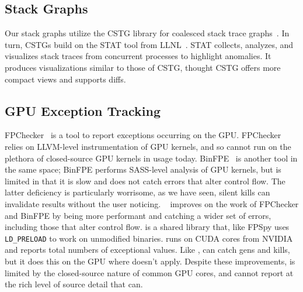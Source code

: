 \documentclass{juliacon}
\begin{document}
\subsection{Stack Graphs}

Our stack graphs utilize the CSTG library for coalesced stack trace graphs~\cite{humphreySystematicDebuggingMethods2014}.
In turn, CSTGs build on the STAT tool from LLNL~\cite{arnoldStackTraceAnalysis2007}.
STAT collects, analyzes, and visualizes stack traces from concurrent processes
to highlight anomalies.
It produces visualizations similar to those of CSTG, thought CSTG offers more compact views and supports diffs.

\subsection{GPU Exception Tracking}

FPChecker~\cite{l-ase-2019} is a tool to report \fp{} exceptions occurring on the GPU.
FPChecker relies on LLVM-level instrumentation of GPU kernels, and so cannot run on the plethora of closed-source GPU kernels in usage today.
BinFPE~\cite{llg-soap-2022} is another tool in the same space;
BinFPE performs SASS-level analysis of GPU kernels, but is limited in that it is slow and does not catch errors that alter control flow.
The latter deficiency is particularly worrisome, as we have seen, silent \NaN{} kills can invalidate results without the user noticing.
\GPUFPX{}~\cite{llsflg-hpdc-2023} improves on the work of FPChecker and BinFPE by being more performant and catching a wider set of errors, including those that alter control flow.
\GPUFPX{} is a shared library that, like FPSpy uses \texttt{LD\_PRELOAD} to work on unmodified binaries.
\GPUFPX{} runs on CUDA cores from NVIDIA and reports total numbers of exceptional values.
Like \FT{}, \GPUFPX{} can catch \NaN{} gens and kills, but it does this on the GPU where \FT{} doesn't apply.
Despite these improvements, \GPUFPX{} is limited by the closed-source nature of common GPU cores, and cannot report at the rich level of source detail that \FT{} can.


\end{document}
